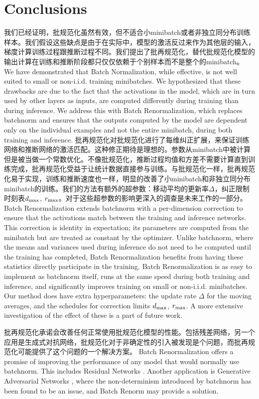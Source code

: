 \section{Conclusions}
我们已经证明，批规范化虽然有效，但不适合小minibatch或者非独立同分布训练样本。我们假设这些缺点是由于在实际中，模型的激活反过来作为其他层的输入，梯度计算训练过程跟推断过程不同。我们提出了批再规范化，替代批规范化模型的输出计算在训练和推断阶段都只仅仅依赖于个别样本而不是整个的minibatch。
We have demonstrated that Batch Normalization, while effective, is not well suited to small or non-i.i.d. training minibatches. We hypothesized that these drawbacks are due to the fact that the activations in the model, which are in turn used by other layers as inputs, are computed differently during training than during inference. We address this with Batch Renormalization, which replaces batchnorm and ensures that the outputs computed by the model are dependent only on the individual examples and not the entire minibatch, during both training and inference.
批再规范化对批规范化进行了每维纠正扩展，来保证训练网络和推断网络的激活匹配。这种修正期待是理想的。参数从minibatch中被计算但是被当做一个常数优化。不像批规范化，推断过程均值和方差不需要计算直到训练完成，批再规范化受益于让统计数据直接参与训练。与批规范化一样，批再规范化易于实现，训练和推断速度也一样，明显的改善了小minibatch和非独立同分布minibatch的训练。我们的方法有额外的超参数：移动平均的更新率$\Delta$，纠正限制时刻表$d_{\text{max}}$, $r_{\text{max}}$。对于这些超参数的影响更深入的调查是未来工作的一部分。
Batch Renormalization extends batchnorm with a per-dimension correction to ensure that the activations match between the training and inference networks. This correction is identity in expectation; its parameters are computed from the minibatch but are treated as constant by the optimizer. Unlike batchnorm, where the means and variances used during inference do not need to be computed until the training has completed, Batch Renormalization benefits from having these statistics directly participate in the training. Batch Renormalization is as easy to implement as batchnorm itself, runs at the same speed during both training and inference, and significantly improves training on small or non-i.i.d. minibatches. Our method does have extra hyperparameters: the update rate $\Delta$ for the moving averages, and the schedules for correction limits $d_{\text{max}}$, $r_{\text{max}}$. A more extensive investigation of the effect of these is a part of future work.

批再规范化承诺会改善任何正常使用批规范化模型的性能。包括残差网络，另一个应用是生成式对抗网络，批规范化对于非确定性的引入被发现是个问题，而批再规范化可能提供了这个问题的一个解决方案。
Batch Renormalization offers a promise of improving the performance of any model that would normally use batchnorm. This includes Residual Networks \cite{resnet}. Another application is Generative Adversarial Networks \cite{gan}, where the non-determinism introduced by batchnorm has been found to be an issue, and Batch Renorm may provide a solution.


